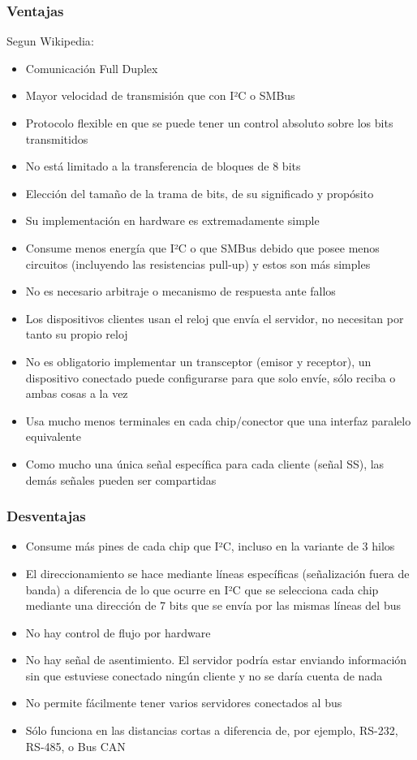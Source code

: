 \documentclass[../informe_krapp.tex]{subfiles}
\begin{document}
\subsubsection{Ventajas}
Segun Wikipedia\cite{wikipedia_spi}:
\begin{itemize}
	\item Comunicación Full Duplex
	\item Mayor velocidad de transmisión que con I²C o SMBus
	\item Protocolo flexible en que se puede tener un control absoluto sobre los bits transmitidos
	\item No está limitado a la transferencia de bloques de 8 bits
	\item Elección del tamaño de la trama de bits, de su significado y propósito
	\item Su implementación en hardware es extremadamente simple
	\item Consume menos energía que I²C o que SMBus debido que posee menos circuitos (incluyendo las resistencias pull-up) y estos son más simples
	\item No es necesario arbitraje o mecanismo de respuesta ante fallos
	\item Los dispositivos clientes usan el reloj que envía el servidor, no necesitan por tanto su propio reloj
	\item No es obligatorio implementar un transceptor (emisor y receptor), un dispositivo conectado puede configurarse para que solo envíe, sólo reciba o ambas cosas a la vez
	\item Usa mucho menos terminales en cada chip/conector que una interfaz paralelo equivalente
	\item Como mucho una única señal específica para cada cliente (señal SS), las demás señales pueden ser compartidas
\end{itemize}

\subsubsection{Desventajas}
\begin{itemize}
	\item Consume más pines de cada chip que I²C, incluso en la variante de 3 hilos
	\item El direccionamiento se hace mediante líneas específicas (señalización fuera de banda) a diferencia de lo que ocurre en I²C que se selecciona cada chip mediante una dirección de 7 bits que se envía por las mismas líneas del bus
	\item No hay control de flujo por hardware
	\item No hay señal de asentimiento. El servidor podría estar enviando información sin que estuviese conectado ningún cliente y no se daría cuenta de nada
	\item No permite fácilmente tener varios servidores conectados al bus
	\item Sólo funciona en las distancias cortas a diferencia de, por ejemplo, RS-232, RS-485, o Bus CAN
\end{itemize}
\clearpage
\end{document}

